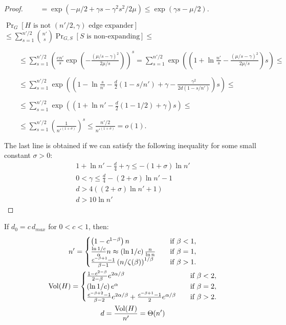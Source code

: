 \begin{proof}
    $\qquad=\exp(-\mu/2+\gamma s-\gamma^2s^2/2\mu)\leq\exp(\gamma s-\mu/2)$.
    
    $\Pr_G[H\text{ is not }(n'/2,\gamma)\text{ edge expander}]$
    $\leq\sum_{s=1}^{n'/2}{\binom{n'}{s}\Pr_{G,S}[S\text{ is non-expanding}]}\leq$
    
    $\qquad\leq\sum_{s=1}^{n'/2}{\left(\frac{en'}{s}\exp\left(-\frac{(\mu/s-\gamma)^2}{2\mu/s}\right)\right)^s}
    =\sum_{s=1}^{n'/2}{\exp\left(\left(1+\ln\frac{n'}{s}-\frac{(\mu/s-\gamma)^2}{2\mu/s}\right)s\right)}\leq$
    
    $\qquad\leq\sum_{s=1}^{n'/2}{\exp\left(\left(
        1
        -\ln\frac{s}{n'}
        -\frac{d}{2}\left(1-s/n'\right)
        +\gamma
        -\frac{\gamma^2}{2d\left(1-s/n'\right)}
    \right)s\right)}\leq$
    
    $\qquad\leq\sum_{s=1}^{n'/2}{\exp\left(\left(
        1+\ln n'
        -\frac{d}{2}(1-1/2)
        +\gamma
    \right)s\right)}\leq$
    
    $\qquad\leq\sum_{s=1}^{n'/2}{\left(\frac{1}{n'^{(1+\sigma)}}\right)^s}\leq\frac{n'/2}{n'^{(1+\sigma)}}=o(1).$
    
    The last line is obtained if we can satisfy the following inequality
    for some small constant $\sigma>0$:
    \begin{gather*}
        1+\ln n'-\frac{d}{4}+\gamma\leq-(1+\sigma)\ln n'\\
        0<\gamma\leq\frac{d}{4}-(2+\sigma)\ln n'-1\\
        d>4\left((2+\sigma)\ln n'+1\right)\\
        d>10\ln n'
    \end{gather*}
\end{proof}

\begin{lemma}
    \label{lem:powerlaw-coin-toss-size-vol-of-h}
    If $d_0=c\,d_{max}$ for $0<c<1$, then:
    \begin{gather}
        n'=
        \begin{cases}
            \left(1-c^{1-\beta}\right)n & \quad \text{if } \beta<1,\\
            \frac{\ln 1/c}{\alpha}n\approx\left(\ln 1/c\right)\frac{n}{\ln n} & \quad \text{if } \beta=1,\\
            \frac{c^{-\beta+1}-1}{\beta-1}\left(n/\zeta(\beta)\right)^{1/\beta} & \quad \text{if } \beta>1. %
        \end{cases}\\
        \Vol(H)=
        \begin{cases}
            \frac{1-c^{2-\beta}}{2-\beta}e^{2\alpha/\beta} & \quad \text{if } \beta<2,\\
            \left(\ln 1/c\right)e^\alpha & \quad \text{if } \beta=2,\\
            \frac{c^{-\beta+2}-1}{\beta-2}e^{2\alpha/\beta}+\frac{c^{-\beta+1}-1}{2}e^{\alpha/\beta} & \quad \text{if } \beta>2.
        \end{cases}\\
        d=\frac{\Vol(H)}{n'}=\Theta(n')
    \end{gather}
\end{lemma}

